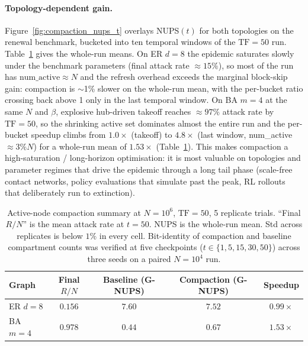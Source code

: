 \documentclass[a4paper,fleqn]{cas-sc}
\theoremstyle{definition}
\theoremstyle{remark}
\begin{document}
\paragraph{Topology-dependent gain.}
Figure~\ref{fig:compaction_nups_t} overlays NUPS$(t)$ for both topologies on the renewal benchmark, bucketed into ten temporal windows of the $\mathrm{TF}=50$ run. Table~\ref{tab:compaction_summary} gives the whole-run means. On ER $d{=}8$ the epidemic saturates slowly under the benchmark parameters (final attack rate $\approx 15\%$), so most of the run has $\mathrm{num\_active} \approx N$ and the refresh overhead exceeds the marginal block-skip gain: compaction is $\sim$1\% slower on the whole-run mean, with the per-bucket ratio crossing back above 1 only in the last temporal window. On BA $m{=}4$ at the same $N$ and $\beta$, explosive hub-driven takeoff reaches $\approx 97\%$ attack rate by $\mathrm{TF}=50$, so the shrinking active set dominates almost the entire run and the per-bucket speedup climbs from $1.0\times$ (takeoff) to $4.8\times$ (last window, num\_active $\approx 3\% N$) for a whole-run mean of $\mathbf{1.53\times}$ (Table~\ref{tab:compaction_summary}). This makes compaction a high-saturation / long-horizon optimisation: it is most valuable on topologies and parameter regimes that drive the epidemic through a long tail phase (scale-free contact networks, policy evaluations that simulate past the peak, RL rollouts that deliberately run to extinction).

\begin{table}[!htbp]
\caption{Active-node compaction summary at $N{=}10^6$, $\mathrm{TF}{=}50$, 5 replicate trials. ``Final $R/N$'' is the mean attack rate at $t{=}50$. NUPS is the whole-run mean. Std across replicates is below $1\%$ in every cell. Bit-identity of compaction and baseline compartment counts was verified at five checkpoints ($t \in \{1, 5, 15, 30, 50\}$) across three seeds on a paired $N{=}10^4$ run.}
\label{tab:compaction_summary}
\centering
\begin{tabular*}{\tblwidth}{@{\extracolsep{\fill}}lcccc@{}}
\toprule
\textbf{Graph} & \textbf{Final $R/N$} & \textbf{Baseline (G-NUPS)} & \textbf{Compaction (G-NUPS)} & \textbf{Speedup} \\
\midrule
ER $d{=}8$  & $0.156$ & $7.60$ & $7.52$ & $0.99\times$ \\
BA $m{=}4$  & $0.978$ & $0.44$ & $0.67$ & $\mathbf{1.53\times}$ \\
\bottomrule
\end{tabular*}
\end{table}
\end{document}
